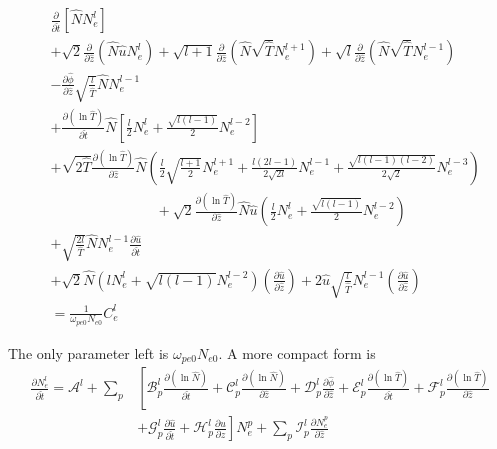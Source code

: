 \documentclass[final]{jpp}
\begin{document}
\begin{align}
 &\frac{\partial}{\partial \hat{t}}[\hat{N} N_e^l] \nonumber\\
 &+\sqrt{2} \frac{\partial}{\partial \hat{z}} \left( \hat{N} \hat{u}N_e^l\right) + \sqrt{l+1}  \frac{\partial}{\partial \hat{z}}  \left( \hat{N} \sqrt{\hat{T}}N_e^{l+1}\right)  + \sqrt{l}  \frac{\partial}{\partial \hat{z}}  \left( \hat{N} \sqrt{\hat{T}}N_e^{l-1}\right) 
 \nonumber\\
&-  \frac{\partial \hat{\phi}}{\partial \hat{z}} \sqrt{\frac{l}{ \hat{T}}} \hat{N} N_e^{l-1}\nonumber\\
&+ \frac{\partial  (\ln \hat{T} )}{\partial \hat{t}} \hat{N} \left[ \frac{l}{2}N_e^l+ \frac{\sqrt{l(l-1)}}{2}  N_e^{l-2} \right] \nonumber\\
&+ \sqrt{2\hat{T}}\frac{\partial (\ln \hat{T})}{\partial \hat{z}}\hat{N} \left(  \frac{l}{2}\sqrt{\frac{l+1}{2}} N_e^{l+1}+\frac{l(2l-1)}{2\sqrt{2l}} N_e^{l-1} + \frac{\sqrt{l(l-1)(l-2)}}{2\sqrt{2}} N_e^{l-3}  \right) \nonumber \\
&\;\;\;\;\;\;\;\;\;\;\;\;\;\;\;\;\;\;\;\;\;\;\;\;\;\;\; +  \sqrt{2}\frac{\partial (\ln \hat{T})}{\partial \hat{z}}\hat{N} \hat{u} \left(\frac{l}{2}N_e^l+  \frac{\sqrt{l(l-1)}}{2}N_e^{l-2} \right) \nonumber\\
& +  \sqrt{\frac{2l}{\hat{T}}} \hat{N}N_e^{l-1} \frac{\partial \hat{u}}{\partial \hat{t}}\nonumber\\
&+ \sqrt{2}\hat{N}\left( lN_e^l+ \sqrt{l(l-1)}N_e^{l-2} \right)\left(\frac{\partial \hat{u}}{\partial \hat{z}} \right) + 2  \hat{u} \sqrt{\frac{l}{\hat{T}}}  N_e^{l-1} \left(\frac{\partial \hat{u}}{\partial \hat{z}} \right) \nonumber\\
&= \frac{1}{\omega_{pe0}N_{e0}} C_e^l 
\end{align}

The only parameter left is $ \omega_{pe0}N_{e0} $. A more compact form is 
\begin{align}
\frac{\partial N_e^l}{\partial \hat{t}}= \mathcal{A}^l + \sum_p &\left[ \mathcal{B}_p^l \frac{\partial (\ln\hat{N})}{\partial \hat{t}} + \mathcal{C}_p^l  \frac{\partial (\ln\hat{N})}{\partial \hat{z}}+ \mathcal{D}_p^l \frac{\partial \hat\phi}{\partial \hat{z}}  + \mathcal{E}_p^l \frac{\partial (\ln \hat{T})}{\partial \hat{t}} + \mathcal{F}_p^l \frac{\partial (\ln\hat{T})}{\partial \hat{z}} \right. \nonumber\\
&\left. + \mathcal{G}_p^l \frac{\partial \hat{u}}{\partial \hat{t}} + \mathcal{H}_p^l  \frac{\partial \hat{u}}{\partial \hat{z}} \right]N_e^p +  \sum_p \mathcal{I}_p^l \frac{\partial N_e^p}{\partial\hat{z}}    \label{eq:time_evo_Nel}
\end{align}
\end{document}
